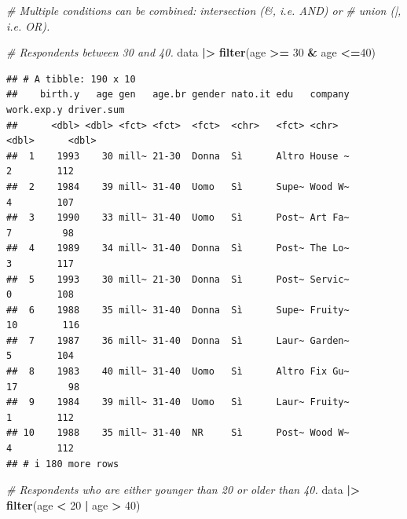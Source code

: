 \documentclass[
]{book}
\newenvironment{Shaded}{\begin{snugshade}}{\end{snugshade}}
\newcommand{\CommentTok}[1]{\textcolor[rgb]{0.56,0.35,0.01}{\textit{#1}}}
\newcommand{\DecValTok}[1]{\textcolor[rgb]{0.00,0.00,0.81}{#1}}
\newcommand{\FunctionTok}[1]{\textcolor[rgb]{0.13,0.29,0.53}{\textbf{#1}}}
\newcommand{\NormalTok}[1]{#1}
\newcommand{\SpecialCharTok}[1]{\textcolor[rgb]{0.81,0.36,0.00}{\textbf{#1}}}
\begin{document}
\begin{Shaded}
\begin{Highlighting}[]
\CommentTok{\# Multiple conditions can be combined: intersection (\&, i.e. AND) or }
\CommentTok{\# union (|, i.e. OR). }

\CommentTok{\# Respondents between 30 and 40.}
\NormalTok{data }\SpecialCharTok{|\textgreater{}} 
  \FunctionTok{filter}\NormalTok{(age }\SpecialCharTok{\textgreater{}=} \DecValTok{30} \SpecialCharTok{\&}\NormalTok{ age }\SpecialCharTok{\textless{}=}\DecValTok{40}\NormalTok{)}
\end{Highlighting}
\end{Shaded}

\begin{verbatim}
## # A tibble: 190 x 10
##    birth.y   age gen   age.br gender nato.it edu   company work.exp.y driver.sum
##      <dbl> <dbl> <fct> <fct>  <fct>  <chr>   <fct> <chr>        <dbl>      <dbl>
##  1    1993    30 mill~ 21-30  Donna  Sì      Altro House ~          2        112
##  2    1984    39 mill~ 31-40  Uomo   Sì      Supe~ Wood W~          4        107
##  3    1990    33 mill~ 31-40  Uomo   Sì      Post~ Art Fa~          7         98
##  4    1989    34 mill~ 31-40  Donna  Sì      Post~ The Lo~          3        117
##  5    1993    30 mill~ 21-30  Donna  Sì      Post~ Servic~          0        108
##  6    1988    35 mill~ 31-40  Donna  Sì      Supe~ Fruity~         10        116
##  7    1987    36 mill~ 31-40  Donna  Sì      Laur~ Garden~          5        104
##  8    1983    40 mill~ 31-40  Uomo   Sì      Altro Fix Gu~         17         98
##  9    1984    39 mill~ 31-40  Uomo   Sì      Laur~ Fruity~          1        112
## 10    1988    35 mill~ 31-40  NR     Sì      Post~ Wood W~          4        112
## # i 180 more rows
\end{verbatim}

\begin{Shaded}
\begin{Highlighting}[]
\CommentTok{\# Respondents who are either younger than 20 or older than 40.}
\NormalTok{data }\SpecialCharTok{|\textgreater{}} 
  \FunctionTok{filter}\NormalTok{(age }\SpecialCharTok{\textless{}} \DecValTok{20} \SpecialCharTok{|}\NormalTok{ age }\SpecialCharTok{\textgreater{}} \DecValTok{40}\NormalTok{)}
\end{Highlighting}
\end{Shaded}
\end{document}
